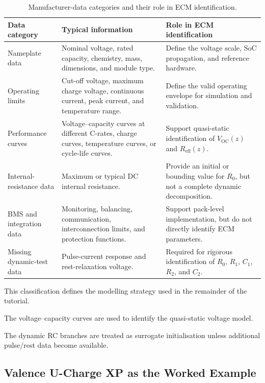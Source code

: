 \documentclass[a4paper,12pt]{article}
\begin{document}
\begin{table}[H]
\centering
\caption{Manufacturer-data categories and their role in ECM identification.}
\label{tab:generic_manufacturer_data_ecm}
\begin{tabularx}{0.98\textwidth}{@{}L{0.25\textwidth}Y Y@{}}
\toprule
\textbf{Data category} &
\textbf{Typical information} &
\textbf{Role in ECM identification} \\
\midrule
Nameplate data &
Nominal voltage, rated capacity, chemistry, mass, dimensions, and module type. &
Define the voltage scale, SoC propagation, and reference hardware. \\
Operating limits &
Cut-off voltage, maximum charge voltage, continuous current, peak current, and temperature range. &
Define the valid operating envelope for simulation and validation. \\
Performance curves &
Voltage--capacity curves at different C-rates, charge curves, temperature curves, or cycle-life curves. &
Support quasi-static identification of \(V_{\mathrm{OC}}(z)\) and \(R_{\mathrm{eff}}(z)\). \\
Internal-resistance data &
Maximum or typical DC internal resistance. &
Provide an initial or bounding value for \(R_0\), but not a complete dynamic decomposition. \\
BMS and integration data &
Monitoring, balancing, communication, interconnection limits, and protection functions. &
Support pack-level implementation, but do not directly identify ECM parameters. \\
Missing dynamic-test data &
Pulse-current response and rest-relaxation voltage. &
Required for rigorous identification of \(R_0\), \(R_1\), \(C_1\), \(R_2\), and \(C_2\). \\
\bottomrule
\end{tabularx}
\end{table}

This classification defines the modelling strategy used in the remainder of the tutorial.

The voltage--capacity curves are used to identify the quasi-static voltage model.

The dynamic RC branches are treated as surrogate initialisation unless additional pulse/rest data become available.

\subsection{Valence U-Charge XP as the Worked Example}
\end{document}
